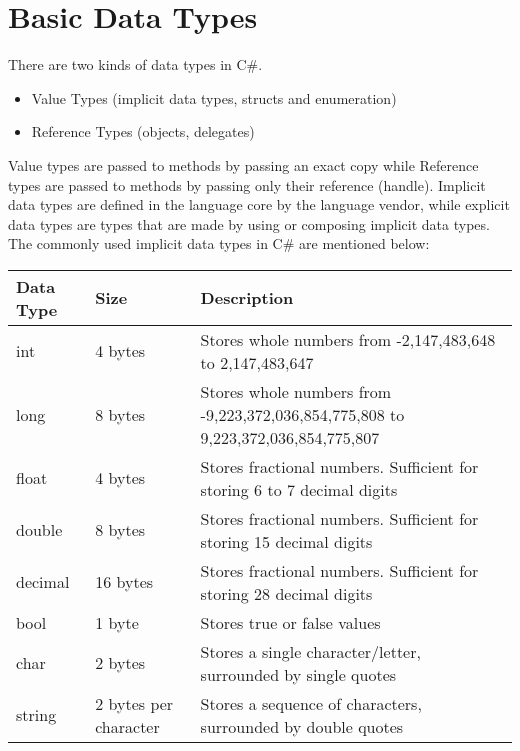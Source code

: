 \section{Basic Data Types}
There are two kinds of data types in C\#.

\begin{itemize}
    \item Value Types (implicit data types, structs and enumeration)
    \item Reference Types (objects, delegates)  
\end{itemize}

Value types are passed to methods by passing an exact copy while Reference types are passed to methods by
passing only their reference (handle). Implicit data types are defined in the language core by the language vendor,
while explicit data types are types that are made by using or composing implicit data types.
The commonly used implicit data types in C\# are mentioned below:

\begin{center}
    \begin{tabular}{ | m{5em} | m{2cm}| m{10cm} | } 
    \hline
    Data Type & Size & Description \\
    \hline
    int	    &   4 bytes &	Stores whole numbers from -2,147,483,648 to 2,147,483,647\\
    long	&	8 bytes	&   Stores whole numbers from -9,223,372,036,854,775,808 to 9,223,372,036,854,775,807\\
    float	&	4 bytes	&   Stores fractional numbers. Sufficient for storing 6 to 7 decimal digits\\
    double	&	8 bytes	&   Stores fractional numbers. Sufficient for storing 15 decimal digits\\
    decimal	&	16 bytes&   Stores fractional numbers. Sufficient for storing 28 decimal digits\\
    bool	&	1 byte	&   Stores true or false values\\
    char	&	2 bytes	&   Stores a single character/letter, surrounded by single quotes\\
    string	&	2 bytes per character &	Stores a sequence of characters, surrounded by double quotes\\
    \hline
    \end{tabular}
\end{center}


